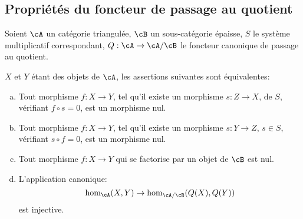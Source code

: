 \subsection{Propri\'et\'es du foncteur de passage au quotient}\label{VIII:2-5}

Soient $\cA$ un cat\'egorie triangul\'ee, $\cB$ un sous-cat\'egorie \'epaisse, 
$S$ le syst\`eme multiplicatif correspondant, $Q:\cA\to \cA/\cB$ le foncteur 
canonique de passage au quotient. 





\begin{proposition}\label{VIII:2-5-1}
$X$ et $Y$ \'etant des objets de $\cA$, les assertions suivantes sont 
\'equivalentes: 
\begin{enumerate}[(a)]
  \item Tout morphisme $f:X\to Y$, tel qu'il existe un morphisme $s:Z\to X$, de 
    $S$, v\'erifiant $f\circ s=0$, est un morphisme nul.
  \item Tout morphisme $f:X\to Y$, tel qu'il existe un morphisme $s:Y\to Z$, 
    $s\in S$, v\'erifiant $s\circ f=0$, est un morphisme nul. 
  \item Tout morphisme $f:X\to Y$ qui se factorise par un objet de $\cB$ est 
    nul. 
  \item L'application canonique: 
    \[
      \hom_\cA(X,Y) \to \hom_{\cA/\cB}(Q(X),Q(Y))
    \]
    est injective. 
\end{enumerate}
\end{proposition}






